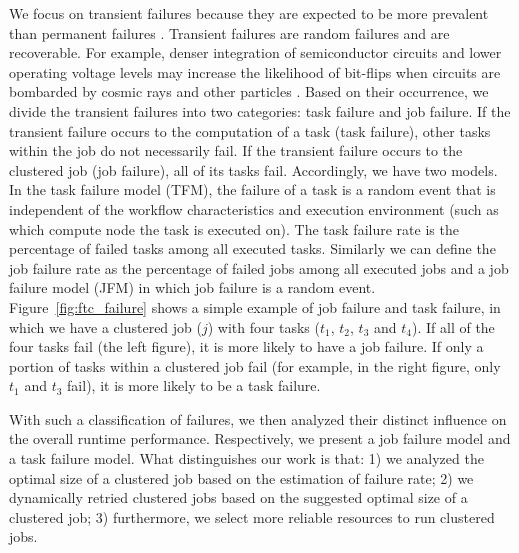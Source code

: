 We focus on transient failures because they are expected to be more prevalent than permanent failures \cite{Zhang2004}. Transient failures are random failures and are recoverable. For example, denser integration of semiconductor circuits and lower operating voltage levels may increase the likelihood of bit-flips when circuits are bombarded by cosmic rays and other particles \cite{Zhang2004}. Based on their occurrence, we divide the transient failures into two categories: task failure and job failure. If the transient failure occurs to the computation of a task (task failure), other tasks within the job do not necessarily fail. If the transient failure occurs to the clustered job (job failure), all of its tasks fail. Accordingly, we have two models. In the task failure model (TFM), the failure of a task is a random event that is independent of the workflow characteristics and execution environment (such as which compute node the task is executed on). The task failure rate is the percentage of failed tasks among all executed tasks. Similarly we can define the job failure rate as the percentage of failed jobs among all executed jobs and a job failure model (JFM) in which job failure is a random event. Figure~\ref{fig:ftc_failure} shows a simple example of job failure and task failure, in which we have a clustered job ($j$) with four tasks ($t_1$, $t_2$, $t_3$ and $t_4$). If all of the four tasks fail (the left figure), it is more likely to have a job failure. If only a portion of tasks within a clustered job fail (for example, in the right figure, only $t_1$ and $t_3$ fail), it is more likely to be a task failure. 

With such a classification of failures, we then analyzed their distinct influence on the overall runtime performance. Respectively, we present a job failure model and a task failure model. What distinguishes our work is that: 1) we analyzed the optimal size of a clustered job based on the estimation of failure rate; 2) we dynamically retried clustered jobs based on the suggested optimal size of a clustered job; 3) furthermore, we select more reliable resources to run clustered jobs. 


